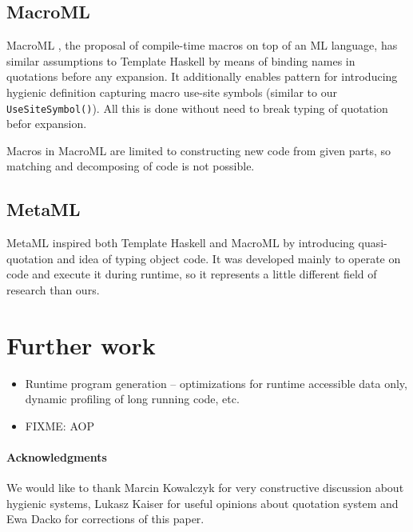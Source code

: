 \documentclass{llncs}
\begin{document}
\subsection{MacroML}
MacroML \cite{MacroML}, the proposal of compile-time macros on top of an ML language, 
has similar assumptions to Template Haskell by means of binding names in quotations before 
any expansion. It additionally enables pattern for introducing hygienic definition capturing
macro use-site symbols (similar to our \verb,UseSiteSymbol(),). All this is done
without need to break typing of quotation befor expansion.

Macros in MacroML are limited to constructing new code from given parts, so matching
and decomposing of code is not possible.

\subsection{MetaML}
MetaML \cite{MetaML} inspired both Template Haskell and MacroML by introducing 
quasi-quotation and idea of typing object code. It was developed mainly to operate 
on code and execute it during runtime, so it represents a little different field of 
research than ours.

\section{Further work}
\begin{itemize}
\item Runtime program generation -- optimizations for runtime accessible data only,
   dynamic profiling of long running code, etc.
\item FIXME: AOP
\end{itemize}

\paragraph{Acknowledgments}
We would like to thank Marcin Kowalczyk for very constructive discussion about hygienic
systems, Lukasz Kaiser for useful opinions about quotation system and Ewa Dacko for
corrections of this paper.
\end{document}
